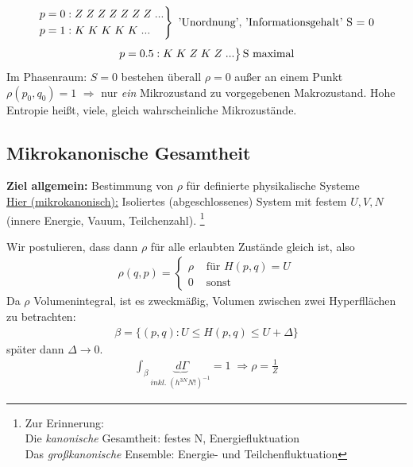 \documentclass[12pt]{article}
\begin{document}
\begin{align*}
\begin{rcases}
p= 0: Z\; Z\; Z\; Z\; Z\; Z\; Z\; ... \\ 
p= 1: K\; K\; K\; K\; K\;  ...  
\end{rcases}
\text{ 'Unordnung', 'Informationsgehalt' S = 0} \\
\end{align*}
\begin{align*}
\begin{rcases}
p= 0.5: K\; K\; Z\; K\;  Z\; ...
\end{rcases}
\text{S maximal}
\end{align*}
Im Phasenraum: $S=0$ bestehen überall $\rho = 0$ außer an einem Punkt $\rho(p_0, q_0) = 1$ $\Rightarrow$ nur \textit{ein} Mikrozustand zu vorgegebenen Makrozustand. Hohe Entropie heißt, viele, gleich wahrscheinliche Mikrozustände. 

\subsection{Mikrokanonische Gesamtheit}
\textbf{Ziel allgemein:} Bestimmung von $\rho$ für definierte physikalische Systeme \\
\underline{Hier (mikrokanonisch):} Isoliertes (abgeschlossenes) System mit festem $U,V,N$ (innere Energie, Vauum, Teilchenzahl). \footnote{Zur Erinnerung: \\ Die \textit{kanonische} Gesamtheit: festes N, Energiefluktuation\\ Das\textit{ großkanonische} Ensemble: Energie- und Teilchenfluktuation}

Wir postulieren, dass dann $\rho$ für alle erlaubten Zustände gleich ist, also
\begin{align}
\rho (q,p) = 
\begin{cases}
\rho  & \mbox{ für } H(p,q) = U \\
0 & \mbox{ sonst }
\end{cases}
\end{align}
Da $\rho $ Volumenintegral, ist es zweckmäßig, Volumen zwischen zwei Hyperfllächen zu betrachten: 
\begin{align}
\beta = \{ (p,q): U \leq H (p,q) \leq U +\Delta \}
\end{align}
später dann $\Delta \to 0$. 
\begin{align}
\int_\beta \underbrace{ \; d \Gamma }_{ inkl.  \; (h^{3N} N!)^{-1}  } = 1 \; \Rightarrow \rho = \frac{1}{Z}
\end{align} 
\end{document}
